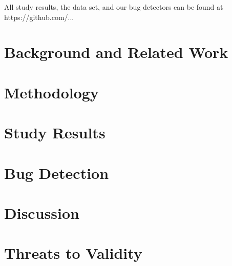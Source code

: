 \documentclass[conference]{../styles/IEEEtran}
\begin{document}
    All study results, the data set, and our bug detectors can be found at https://github.com/...



    \section{Background and Related Work}



    \section{Methodology}



    \section{Study Results}



    \section{Bug Detection}



    \section{Discussion}



    \section{Threats to Validity}


\end{document}
